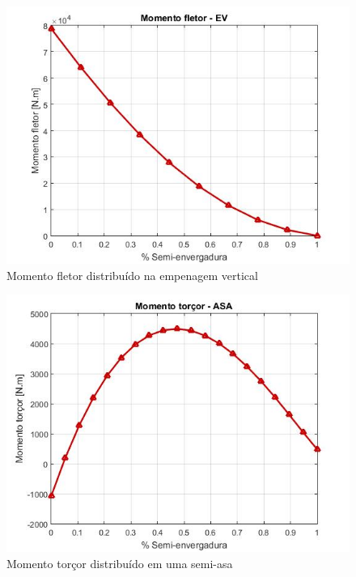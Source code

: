 \begin{figure}
\centering
\includegraphics[width=\textwidth]{cargas/imagens/flet_EV.jpg}
\caption{Momento fletor distribuído na empenagem vertical}
\label{fig:flet_EV}
\end{figure}

\begin{figure}
\centering
\includegraphics[width=\textwidth]{cargas/imagens/torc_ASA.jpg}
\caption{Momento torçor distribuído em uma semi-asa}
\label{fig:torc_ASA}
\end{figure}

